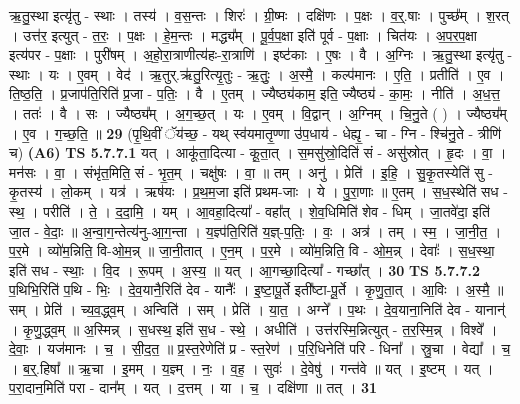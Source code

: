 \documentclass[17pt]{extarticle}
\begin{document}
                  ऋ॒तु॒स्था इत्यृ॑तु - स्थाः । तस्य॑ । व॒स॒न्तः । शिरः॑ । ग्री॒ष्मः । दक्षि॑णः । प॒क्षः । व॒र्॒.षाः । पुच्छ᳚म् । श॒रत् । उत्त॑र॒ इत्युत् - त॒रः॒ । प॒क्षः । हे॒म॒न्तः । मद्ध्य᳚म् । पू॒र्व॒प॒क्षा इति॑ पूर्व - प॒क्षाः । चित॑यः । अ॒प॒र॒प॒क्षा इत्य॑पर - प॒क्षाः । पुरी॑षम् । अ॒हो॒रा॒त्राणीत्य॑हः-रा॒त्राणि॑ । इष्ट॑काः । ए॒षः । वै । अ॒ग्निः । ऋ॒तु॒स्था इत्यृ॑तु - स्थाः । यः । ए॒वम् । वेद॑ । ऋ॒तुर्.ऋ॑तु॒रित्यृ॒तुः - ऋ॒तुः॒ । अ॒स्मै॒ । कल्प॑मानः । ए॒ति॒ । प्रतीति॑ । ए॒व । ति॒ष्ठ॒ति॒ । प्र॒जाप॑ति॒रिति॑ प्र॒जा - प॒तिः॒ । वै । ए॒तम् । ज्यैष्ठ्य॑काम॒ इति॒ ज्यैष्ठ्य॑ - का॒मः॒ । नीति॑ । अ॒ध॒त्त॒ । ततः॑ । वै । सः । ज्यैष्ठ्य᳚म् । अ॒ग॒च्छ॒त् । यः । ए॒वम् । वि॒द्वान् । अ॒ग्निम् । चि॒नु॒ते ( ) । ज्यैष्ठ्य᳚म् । ए॒व । ग॒च्छ॒ति॒ ॥ \textbf{  29} \newline
                  \newline
                      (पृ॒थि॒वीं ॅय॑च्छ॒ - यथ् स्व॑यमातृ॒ण्णा उ॑प॒धाय॑ - धेह्यृ॒ - चा - ग्नि - श्चि॑नु॒ते - त्रीणि॑ च)  \textbf{(A6)} \newline \newline
                                \textbf{ TS 5.7.7.1} \newline
                  यत् । आकू॑ता॒दित्या - कू॒ता॒त् । स॒मसु॑स्रो॒दिति॑ सं - असु॑स्रोत् । हृ॒दः । वा॒ । मन॑सः । वा॒ । संभृ॑त॒मिति॒ सं - भृ॒त॒म् । चक्षु॑षः । वा॒ ॥ तम् । अनु॑ । प्रेति॑ । इ॒हि॒ । सु॒कृ॒तस्येति॑ सु - कृ॒तस्य॑ । लो॒कम् । यत्र॑ । ऋष॑यः । प्र॒थ॒म॒जा इति॑ प्रथम-जाः । ये । पु॒रा॒णाः ॥ ए॒तम् । स॒ध॒स्थेति॑ सध - स्थ॒ । परीति॑ । ते॒ । द॒दा॒मि॒ । यम् । आ॒वहा॒दित्या᳚ - वहा᳚त् । शे॒व॒धिमिति॑ शेव - धिम् । जा॒तवे॑दा॒ इति॑ जा॒त - वे॒दाः॒ ॥ अ॒न्वा॒ग॒न्तेत्य॑नु-आ॒ग॒न्ता । य॒ज्ञ्प॑ति॒रिति॑ य॒ज्ञ्-प॒तिः॒ । वः॒ । अत्र॑ । तम् । स्म॒ । जा॒नी॒त॒ । प॒र॒मे । व्यो॑म॒न्निति॒ वि-ओ॒म॒न्न् ॥ जा॒नी॒तात् । ए॒न॒म् । प॒र॒मे । व्यो॑म॒न्निति॒ वि - ओ॒म॒न्न् । देवाः᳚ । स॒ध॒स्था॒ इति॑ सध - स्थाः॒ । वि॒द । रू॒पम् । अ॒स्य॒ ॥ यत् । आ॒गच्छा॒दित्या᳚ - गच्छा᳚त् । \textbf{  30} \newline
                  \newline
                                \textbf{ TS 5.7.7.2} \newline
                  प॒थिभि॒रिति॑ प॒थि - भिः॒ । दे॒व॒यानै॒रिति॑ देव - यानैः᳚ । इ॒ष्टा॒पू॒र्ते इती᳚ष्टा-पू॒र्ते । कृ॒णु॒ता॒त् । आ॒विः । अ॒स्मै॒ ॥ सम् । प्रेति॑ । च्य॒व॒द्ध्व॒म् । अन्विति॑ । सम् । प्रेति॑ । या॒त॒ । अग्ने᳚ । प॒थः । दे॒व॒याना॒निति॑ देव - यानान्॑ । कृ॒णु॒द्ध्व॒म् ॥ अ॒स्मिन्न् । स॒धस्थ॒ इति॑ स॒ध - स्थे॒ । अधीति॑ । उत्त॑रस्मि॒न्नित्युत् - त॒र॒स्मि॒न्न् । विश्वे᳚ । दे॒वाः॒ । यज॑मानः । च॒ । सी॒द॒त॒ ॥ प्र॒स्त॒रेणेति॑ प्र - स्त॒रेण॑ । प॒रि॒धिनेति॑ परि - धिना᳚ । स्रु॒चा । वेद्या᳚ । च॒ । ब॒र्॒.हिषा᳚ ॥ ऋ॒चा । इ॒मम् । य॒ज्ञ्म् । नः॒ । व॒ह॒ । सुवः॑ । दे॒वेषु॑ । गन्त॑वे ॥ यत् । इ॒ष्टम् । यत् । प॒रा॒दान॒मिति॑ परा - दान᳚म् । यत् । द॒त्तम् । या । च॒ । दक्षि॑णा ॥ तत् । \textbf{  31} \newline
\end{document}
